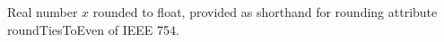 Real number $x$ rounded to float, provided as shorthand for rounding attribute roundTiesToEven of IEEE 754.
